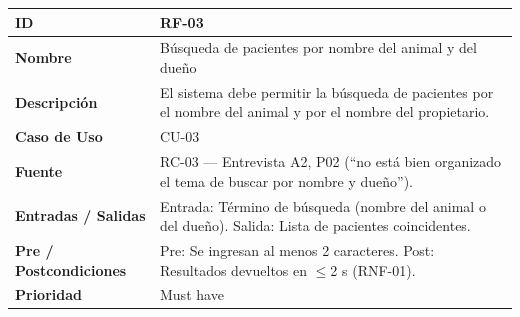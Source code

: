 \documentclass[
]{article}
\newcounter{none} %
\begin{document}
{\def\LTcaptype{none} %
\begin{longtable}[]{|
  >{\raggedright\arraybackslash}p{}|
  >{\raggedright\arraybackslash}p{}|}
\hline
\begin{minipage}[b]{\linewidth}\raggedright
\textbf{ID}
\end{minipage} & \begin{minipage}[b]{\linewidth}\raggedright
RF-03
\end{minipage} \\
\hline
\endhead
\hline
\endlastfoot
\textbf{Nombre} & \begin{minipage}[t]{\linewidth}\raggedright
Búsqueda de pacientes por nombre del animal y del dueño
\end{minipage} \\
\hline
\textbf{Descripción} & \begin{minipage}[t]{\linewidth}\raggedright
El sistema debe permitir la búsqueda de pacientes por el nombre del animal y por el nombre del propietario.
\end{minipage} \\
\hline
\textbf{Caso de Uso} & \begin{minipage}[t]{\linewidth}\raggedright
CU-03
\end{minipage} \\
\hline
\textbf{Fuente} & \begin{minipage}[t]{\linewidth}\raggedright
RC-03 — Entrevista A2, P02 (“no está bien organizado el tema de buscar por nombre y dueño”).
\end{minipage} \\
\hline
\textbf{Entradas / Salidas} & \begin{minipage}[t]{\linewidth}\raggedright
Entrada: Término de búsqueda (nombre del animal o del dueño). Salida: Lista de pacientes coincidentes.
\end{minipage} \\
\hline
\textbf{Pre / Postcondiciones} & \begin{minipage}[t]{\linewidth}\raggedright
Pre: Se ingresan al menos 2 caracteres. Post: Resultados devueltos en $\leq$2 s (RNF-01).
\end{minipage} \\
\hline
\textbf{Prioridad} & \begin{minipage}[t]{\linewidth}\raggedright
Must have
\end{minipage} \\

\end{longtable}}
\end{document}
